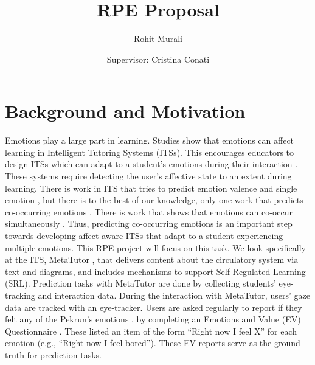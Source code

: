\documentclass[10pt,letterpaper]{article}
\title{\huge \textbf{RPE Proposal}}
\date{}
\author{Rohit Murali \and Supervisor: Cristina Conati}
\begin{document}
\maketitle

\section{Background and Motivation}

Emotions play a large part in learning. Studies \autocite{baker2010better, wortha2019multiple} show that emotions can affect learning in Intelligent Tutoring Systems (ITSs). This encourages educators to design ITSs which can adapt to a student's emotions during their interaction \autocite{woolf2009affect, grawemeyer2016affecting}. These systems require detecting the user's affective state to an extent during learning. There is work in ITS that tries to predict emotion valence \autocite{lalle2018prediction, salmeron2014evaluation} and single emotion \autocite{jaques2014predicting, sims2020neural, woolf2009affect, paquette2014sensor, sabourin2011modeling, lalle2016predicting}, but there is to the best of our knowledge, only one work that predicts co-occurring emotions \autocite{lalle2021predict}.
There is work that shows that emotions can co-occur simultaneously \autocite{bosch2014co, dillon2016student, harley2012measuring, gutica2013student, sinclair2018changes}. Thus, predicting co-occurring emotions is an important step towards developing affect-aware ITSs that adapt to a student experiencing multiple emotions. This RPE project will focus on this task.
We look specifically at the ITS, MetaTutor \autocite{azevedo2013using}, that delivers content about the circulatory system via text and diagrams, and includes mechanisms to support Self-Regulated Learning (SRL). Prediction tasks with MetaTutor are done by collecting students' eye-tracking and interaction data. During the interaction with MetaTutor, users' gaze data are tracked with an eye-tracker. Users are asked regularly to report if they felt any of the Pekrun’s emotions \autocite{pekrun2014self}, by completing an Emotions and Value (EV) Questionnaire \autocite{azevedo2013using}. These listed an item of the form ``Right now I feel X'' for each emotion (e.g., ``Right now I feel bored''). These EV reports serve as the ground truth for prediction tasks.
\end{document}
